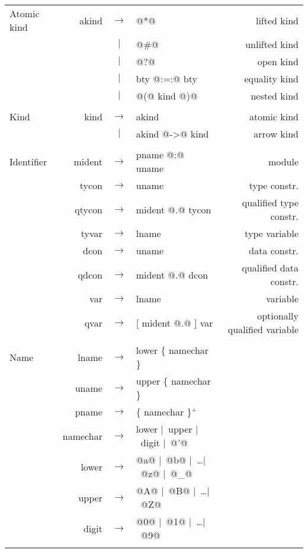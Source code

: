 \documentclass[10pt]{article}
\newcommand{\derives}{\mbox{$\rightarrow$}}
\newcommand{\orderives}{\mbox{$\mid$}}
\newcommand{\many}[1]{\{ {#1} \}}
\newcommand{\oneormore}[1]{\{ {#1} \}$^{+}$}
\begin{document}
{\begin{tabular}{lrclr}
{\rm Atomic kind} & akind & \derives &   @*@ &				{\rm lifted kind}\\
		& 	& \orderives &	 @#@ &				{\rm unlifted kind}\\
		& 	& \orderives &   @?@ &				{\rm open kind}\\
                &    &        \orderives &    bty @:=:@ bty      &      {\rm equality kind} \\
		& 	& \orderives &   @(@ kind @)@&			{\rm nested kind}\\
\\
{\rm Kind} &	kind &	 \derives &	 akind & 			{\rm atomic kind}\\
 	   &	&	 \orderives &	 akind @->@ kind 	 &	{\rm arrow kind} \\
\\
{\rm Identifier}	&	mident & \derives & pname @:@ uname &	{\rm module} \\
	&	tycon &	 \derives &	 uname &	 	{\rm type constr.}  \\
 	&	qtycon & \derives &	 mident @.@  tycon &	{\rm qualified type constr.} \\
	&	tyvar &	 \derives &	 lname &		{\rm type variable} \\
	&	dcon &	 \derives &	 uname &	 	{\rm data constr.} \\
	&	qdcon &	 \derives &	 mident @.@  dcon & 	{\rm qualified data constr.} \\
        &	var &	 \derives &	 lname &		{\rm variable} \\
	&	qvar &	 \derives &	 [ mident @.@ ] var &	{\rm optionally qualified variable} \\
\\
{\rm Name} 	&	lname  &  \derives & 	 lower \many{namechar} \\
 	&       uname &  \derives & 	 upper \many{namechar} & \\
	&       pname &  \derives & 	 \oneormore{namechar} & \\
	&	namechar & \derives &	 lower \orderives\  upper \orderives\  digit \orderives\  @'@ \\
	&	lower &  \derives &      @a@ \orderives\  @b@ \orderives\  \ldots \orderives\  @z@ \orderives\  @_@ \\
	&	upper &  \derives &      @A@ \orderives\  @B@ \orderives\  \ldots \orderives\  @Z@ \\
	& 	digit &  \derives & 	 @0@ \orderives\  @1@ \orderives\  \ldots \orderives\  @9@ \\
\\
\end{tabular}
}
\end{document}
